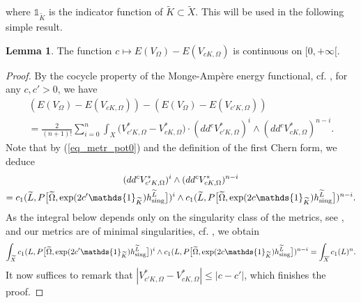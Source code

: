 \documentclass[12pt]{article}
\numberwithin{equation}{section}
\theoremstyle{theorem}
\theoremstyle{definition}
\newtheorem{lem}[thm]{Lemma}
\theoremstyle{remark}
\begin{document}
	where $\mathds{1}_{\widetilde{K}}$ is the indicator function of $\widetilde{K} \subset \widetilde{X}$.
	This will be used in the following simple result.
	\begin{lem}\label{lem_en_cont}
		The function $c \mapsto E(V_{\Omega}) - E(V_{cK, \Omega})$ is continuous on 
$[0, +\infty[$.
	\end{lem}
	\begin{proof}
		By the cocycle property of the Monge-Ampère energy functional, cf. \cite[Corollary 3.2]{BermanBouckBalls}, for any $c, c' > 0$, we have
		\begin{multline}
			(E(V_{\Omega}) - E(V_{c K, \Omega}))
			-
			(E(V_{\Omega}) - E(V_{c' K, \Omega}))
			\\
			=
			\frac{2}{(n + 1)!}
			\sum_{i = 0}^{n} \int_X \big( V_{c' K, \Omega}^* - V_{c K, \Omega}^* \big)
			 \cdot (dd^c V_{c' K, \Omega}^*)^i \wedge (dd^c V_{c K, \Omega}^*)^{n - i}.
		\end{multline}
		Note that by (\ref{eq_metr_pot0}) and the definition of the first Chern form, we deduce
		\begin{multline}\label{eq_ddc_v_c1}
			(dd^c V_{c' K, \Omega}^*)^i \wedge (dd^c V_{c K, \Omega}^*)^{n - i}
			\\
			=
			c_1(\widetilde{L}, P\big[\widetilde{\Omega}, \exp(2 c' \mathds{1}_{\widetilde{K}}) h^{\widetilde{L}}_{{\rm{sing}}} \big])^i \wedge c_1(\widetilde{L}, P\big[\widetilde{\Omega}, \exp(2 c \mathds{1}_{\widetilde{K}}) h^{\widetilde{L}}_{{\rm{sing}}} \big])^{n - i}.
		\end{multline}
		As the integral below depends only on the singularity class of the metrics, see \cite[Theorem 1.2]{BermanBouckBalls}, and our metrics are of minimal singularities, cf. \cite[Proposition 2.2]{GuedjLuZeriahEnv}, we obtain
		\begin{equation}
			\int_{\widetilde{X}} c_1(L, P\big[\widetilde{\Omega}, \exp(2 c' \mathds{1}_{\widetilde{K}}) h^{\widetilde{L}}_{{\rm{sing}}} \big])^i \wedge c_1(L, P\big[\widetilde{\Omega}, \exp(2 c \mathds{1}_{\widetilde{K}}) h^{\widetilde{L}}_{{\rm{sing}}} \big])^{n - i}
			=
			\int_{\overline{X}} c_1(L)^n.
		\end{equation}
		It now suffices to remark that $|V_{c' K, \Omega}^* - V_{c K, \Omega}^*| \leq |c - c'|$, which finishes the proof.
	\end{proof}
	\par 
\end{document}
